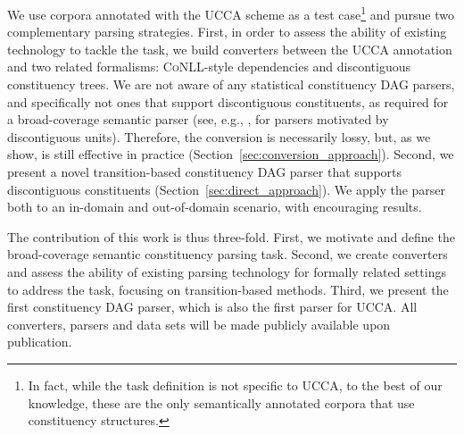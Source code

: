 \documentclass[11pt]{article}
\newcommand{\secref}[1]{Section~\ref{#1}}
\begin{document}
We use corpora annotated with the UCCA scheme \cite{abend2013universal} as a test
case\footnote{In fact, while the task definition is not specific to UCCA,
  to the best of our knowledge, these are the only
  semantically annotated corpora that use constituency structures.}
and pursue two complementary parsing strategies.
First, in order to assess the ability of existing technology to tackle the task,
we build converters between the UCCA annotation and two related formalisms:
\textsc{CoNLL}-style dependencies and discontiguous constituency trees.
We are not aware of any statistical constituency DAG parsers, and specifically not
ones that support discontiguous constituents, as required for a broad-coverage semantic
parser (see, e.g., \cite{pitler2015linear,maier2015discontinuous}, for parsers motivated by discontiguous units). Therefore, the conversion is necessarily lossy, but, as we show, is still effective
in practice (\secref{sec:conversion_approach}).
Second, we present a novel transition-based
constituency DAG parser that supports discontiguous constituents (\secref{sec:direct_approach}). 
We apply the parser both to an in-domain and out-of-domain
scenario, with encouraging results.


The contribution of this work is thus three-fold.
First, we motivate and define the broad-coverage semantic constituency parsing task.
Second, we create converters and assess the ability of existing parsing technology
for formally related settings to address the task, focusing on transition-based methods.
Third, we present the first constituency DAG parser, which is also the
first parser for UCCA. 
All converters, parsers and data sets will be made publicly available upon publication.
\end{document}
